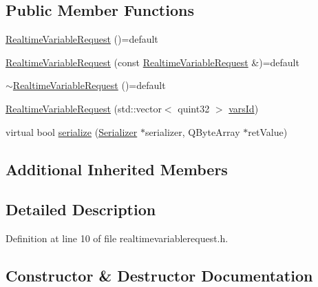 \subsection*{Public Member Functions}
\begin{DoxyCompactItemize}
\item 
\hyperlink{class_a_h_p_1_1_realtime_variable_request_a7c17d1f7f928a5f49c0dc6addfa13ce1}{Realtime\+Variable\+Request} ()=default
\item 
\hyperlink{class_a_h_p_1_1_realtime_variable_request_af4c2806205593d70cadbbf0f1e07e152}{Realtime\+Variable\+Request} (const \hyperlink{class_a_h_p_1_1_realtime_variable_request}{Realtime\+Variable\+Request} \&)=default
\item 
\hyperlink{class_a_h_p_1_1_realtime_variable_request_a1b6085e86fec8c5ce5fdb6fc64dc61f4}{$\sim$\+Realtime\+Variable\+Request} ()=default
\item 
\hyperlink{class_a_h_p_1_1_realtime_variable_request_a327756829b2a8d5e002be0c4d56d6ecc}{Realtime\+Variable\+Request} (std\+::vector$<$ quint32 $>$ \hyperlink{class_a_h_p_1_1_variable_request_aa780d24b9259856ada9419e90eaa8225}{vars\+Id})
\item 
virtual bool \hyperlink{class_a_h_p_1_1_realtime_variable_request_a448db16090f04e1b6635af9a3f9c5291}{serialize} (\hyperlink{class_serializer}{Serializer} $\ast$serializer, Q\+Byte\+Array $\ast$ret\+Value)
\end{DoxyCompactItemize}
\subsection*{Additional Inherited Members}


\subsection{Detailed Description}


Definition at line 10 of file realtimevariablerequest.\+h.



\subsection{Constructor \& Destructor Documentation}
\hypertarget{class_a_h_p_1_1_realtime_variable_request_a7c17d1f7f928a5f49c0dc6addfa13ce1}{}
